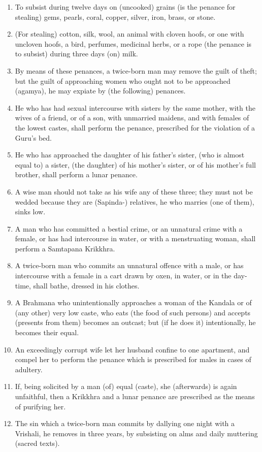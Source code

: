 \begin{enumerate}
\item To subsist during twelve days on (uncooked) grains (is the penance for stealing) gems, pearls, coral, copper, silver, iron, brass, or stone.
\item (For stealing) cotton, silk, wool, an animal with cloven hoofs, or one with uncloven hoofs, a bird, perfumes, medicinal herbs, or a rope (the penance is to subsist) during three days (on) milk.
\item By means of these penances, a twice-born man may remove the guilt of theft; but the guilt of approaching women who ought not to be approached (agamya), he may expiate by (the following) penances.
\item He who has had sexual intercourse with sisters by the same mother, with the wives of a friend, or of a son, with unmarried maidens, and with females of the lowest castes, shall perform the penance, prescribed for the violation of a Guru's bed.
\item He who has approached the daughter of his father's sister, (who is almost equal to) a sister, (the daughter) of his mother's sister, or of his mother's full brother, shall perform a lunar penance.
\item A wise man should not take as his wife any of these three; they must not be wedded because they are (Sapinda-) relatives, he who marries (one of them), sinks low.
\item A man who has committed a bestial crime, or an unnatural crime with a female, or has had intercourse in water, or with a menstruating woman, shall perform a Samtapana Krikkhra.
\item A twice-born man who commits an unnatural offence with a male, or has intercourse with a female in a cart drawn by oxen, in water, or in the day-time, shall bathe, dressed in his clothes.
\item A Brahmana who unintentionally approaches a woman of the Kandala or of (any other) very low caste, who eats (the food of such persons) and accepts (presents from them) becomes an outcast; but (if he does it) intentionally, he becomes their equal.
\item An exceedingly corrupt wife let her husband confine to one apartment, and compel her to perform the penance which is prescribed for males in cases of adultery.
\item If, being solicited by a man (of) equal (caste), she (afterwards) is again unfaithful, then a Krikkhra and a lunar penance are prescribed as the means of purifying her.
\item The sin which a twice-born man commits by dallying one night with a Vrishali, he removes in three years, by subsisting on alms and daily muttering (sacred texts).

\end{enumerate}
